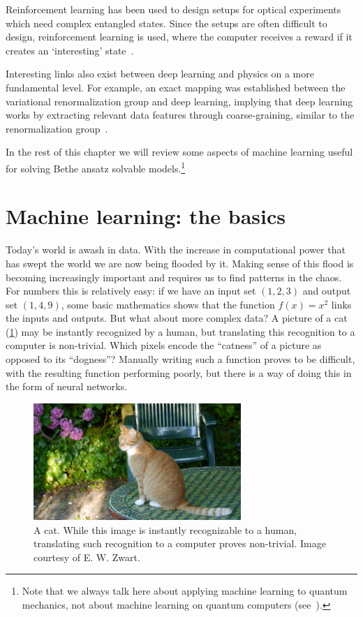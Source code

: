 \documentclass[11pt, a4paper]{report} %
\begin{document}
Reinforcement learning has been used to design setups for optical experiments which need complex entangled states.
Since the setups are often difficult to design, reinforcement learning is used, where the computer receives a reward if it creates an `interesting' state~\cite{Dunjko2017}.

Interesting links also exist between deep learning and physics on a more fundamental level.
For example, an exact mapping was established between the variational renormalization group and deep learning, implying that deep learning works by extracting relevant data features through coarse-graining, similar to the renormalization group~\cite{Mehta2014}. 

In the rest of this chapter we will review some aspects of machine learning useful for solving Bethe ansatz solvable models.\footnote{Note that we always talk here about applying machine learning to quantum mechanics, not about machine learning on quantum computers (see~\cite{Dunjko2017}).}


\section{Machine learning: the basics}
Today's world is awash in data.
With the increase in computational power that has swept the world we are now being flooded by it.
Making sense of this flood is becoming increasingly important and requires us to find patterns in the chaos.
For numbers this is relatively easy: if we have an input set \((1,2,3)\) and output set \((1,4,9)\), some basic mathematics shows that the function \(f(x)=x^2\) links the inputs and outputs.
But what about more complex data?
A picture of a cat (\cref{fig:cat}) may be instantly recognized by a human, but translating this recognition to a computer is non-trivial.
Which pixels encode the ``catness'' of a picture as opposed to its ``dogness''?
Manually writing such a function proves to be difficult, with the resulting function performing poorly, but there is a way of doing this in the form of neural networks. 

\begin{figure}[tb!]
  \centering
  \includegraphics[width=0.7\textwidth]{cat.jpg}
  \caption{A cat. While this image is instantly recognizable to a human, translating such recognition to a computer proves non-trivial. Image courtesy of E. W. Zwart.}\label{fig:cat}
\end{figure}
\end{document}
